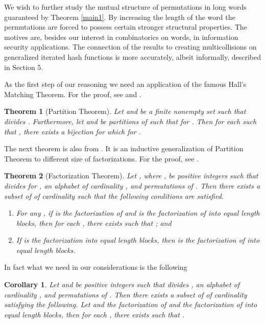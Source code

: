 \documentclass[submission,copyright,creativecommons]{eptcs}
\newtheorem{theorem}{Theorem}
\newtheorem{corollary}{Corollary}
\begin{document}
We wish to further study the mutual structure of permutations in long words guaranteed by Theorem \ref{main1}. By increasing the length of the word  the permutations are forced to possess certain stronger structural properties. The motives are, besides our interest in combinatorics on words, in information security applications. The connection of the results to creating multicollisions on generalized iterated hash functions is more accurately, albeit informally, described in Section 5.

As the first step of our reasoning we need an application of the famous Hall's Matching Theorem. For the proof, see  \cite{KHK} and \cite{HoS}.

\begin{theorem}[Partition Theorem] \label{part}
Let  and  be a finite nonempty set such that  divides
. Furthermore, let  and  be
partitions of  such that  for . Then
for each  such that , there exists a
bijection  for
which  for .
\end{theorem}

The next theorem is also from \cite{KHK}. It is an inductive generalization of Partition Theorem to different size of factorizations. For the proof, see \cite{KHK}.

\begin{theorem}[Factorization Theorem] \label{perint}
Let , where , be positive integers
such that  divides  for ,  an
alphabet of cardinality , and
 permutations of . Then there exists a
subset  of  of cardinality  such that the following
conditions are satisfied.
\begin{enumerate}
\item[\upshape{(1)}] For any , if
   is the factorization of 
   and  is the
  factorization of  into  equal length
   blocks, then for each ,
  there exists  such that
  ; and
\item[\upshape{(2)}] If  is the factorization  into  equal length
   blocks, then    
  is the factorization of 
  into  equal length  blocks.
\end{enumerate}
\end{theorem}

In fact what we need in our considerations is the following 

\begin{corollary}
Let  and  be positive integers such that  divides ,  an
alphabet of cardinality , and
 permutations of . Then there exists a
subset  of  of cardinality  satisfying the following. Let  and  the factorization of  and  the   factorization of  into  equal length  blocks, then for each , there exists  such that .
\end{corollary}
\end{document}
